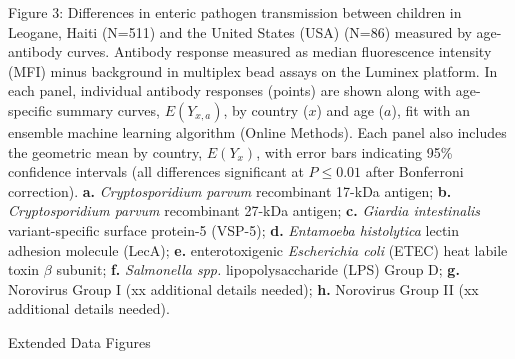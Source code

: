 \documentclass[11pt]{article}
\begin{document}
\clearpage
Figure 3: Differences in enteric pathogen transmission between children in Leogane, Haiti (N=511) and the United States (USA) (N=86) measured by age-antibody curves. Antibody response measured as median fluorescence intensity (MFI) minus background in multiplex bead assays on the Luminex platform. In each panel, individual antibody responses (points) are shown along with age-specific summary curves, $E(Y_{x,a})$, by country ($x$) and age ($a$), fit with an ensemble machine learning algorithm (Online Methods). Each panel also includes the geometric mean by country, $E(Y_{x})$, with error bars indicating 95\% confidence intervals (all differences significant at $P\leq0.01$ after Bonferroni correction).
\textbf{a.} \textit{Cryptosporidium parvum} recombinant 17-kDa antigen;
\textbf{b.} \textit{Cryptosporidium parvum} recombinant 27-kDa antigen;
\textbf{c.} \textit{Giardia intestinalis} variant-specific surface protein-5 (VSP-5);
\textbf{d.} \textit{Entamoeba histolytica} lectin adhesion molecule (LecA);
\textbf{e.} enterotoxigenic \textit{Escherichia coli} (ETEC) heat labile toxin $\beta$ subunit;
\textbf{f.} \textit{Salmonella spp.} lipopolysaccharide (LPS) Group D;
\textbf{g.} Norovirus Group I (xx additional details needed);
\textbf{h.} Norovirus Group II (xx additional details needed).

\clearpage
\begin{center}
{\Large Extended Data Figures}
\end{center}
\vspace{50pt}

\renewcommand{\figurename}{Extended Data Fig.}
\setcounter{figure}{0} 
\end{document}
